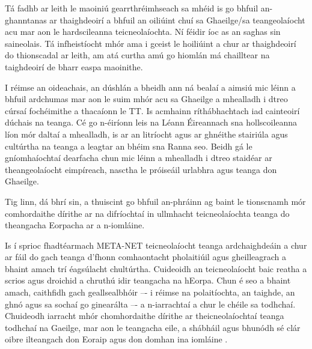 \begin{multicols}{2}
Tá fadhb ar leith le maoiniú gearrthréimhseach sa mhéid is go bhfuil an-ghanntanas ar thaighdeoirí a bhfuil an oiliúint chuí sa Ghaeilge/sa teangeolaíocht acu mar aon le hardscileanna teicneolaíochta. Ní féidir íoc as an saghas sin saineolais. Tá infheistíocht mhór ama i gceist le hoiliúint a chur ar thaighdeoirí do thionscadal ar leith, am atá curtha amú go hiomlán má chailltear na taighdeoirí de bharr easpa maoinithe.

I réimse an oideachais, an dúshlán a bheidh ann ná bealaí a aimsiú mic léinn a bhfuil ardchumas mar aon le suim mhór acu sa Ghaeilge a mhealladh i dtreo cúrsaí fochéimithe a thacaíonn le TT. Is acmhainn ríthábhachtach iad cainteoirí dúchais na teanga. Cé go n-éiríonn leis na Léann Éireannach sna hollscoileanna líon mór daltaí a mhealladh, is ar an litríocht agus ar ghnéithe stairiúla agus cultúrtha na teanga a leagtar an bhéim sna Ranna seo. Beidh gá le gníomhaíochtaí dearfacha chun mic léinn a mhealladh i dtreo staidéar ar theangeolaíocht eimpíreach, nasctha le próiseáil urlabhra agus teanga don Ghaeilge.

Tig linn, dá bhrí sin, a thuiscint go bhfuil an-phráinn ag baint le tionscnamh mór comhordaithe dírithe ar na difríochtaí in ullmhacht teicneolaíochta teanga do theangacha Eorpacha ar a n-iomláine.

Is í sprioc fhadtéarmach META-NET teicneolaíocht teanga ardchaighdeáin a chur ar fáil do gach teanga d’fhonn comhaontacht pholaitiúil agus gheilleagrach a bhaint amach trí éagsúlacht chultúrtha. Cuideoidh an teicneolaíocht  baic reatha a scrios agus droichid a chruthú idir teangacha na hEorpa. Chun é seo a bhaint amach, caithfidh gach geallsealbhóir –- i réimse na polaitíochta, an taighde, an ghnó agus sa sochaí go ginearálta –- a n-iarrachtaí a chur le chéile sa todhchaí. Chuideodh iarracht mhór chomhordaithe dírithe ar theicneolaíochtaí teanga todhchaí na Gaeilge, mar aon le teangacha eile, a shábháil agus bhunódh sé clár oibre ilteangach don Eoraip agus don domhan ina iomláine \cite{tcstar}.


\end{multicols}
